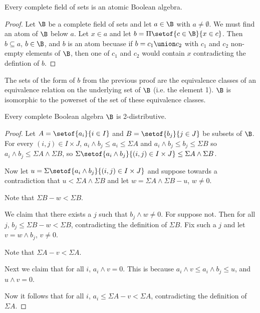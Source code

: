 \documentclass[oneside,12pt]{amsart}
\begin{document}
\begin{lemma}
Every complete field of sets is an atomic Boolean algebra.
\end{lemma}
\begin{proof}
Let $\B$ be a complete field of sets and let $a\in \B$ with $a\not= \emptyset$.
We must find an atom of $\B$ below $a$.
Let $x\in a$ and let $b = \Pi \setof{c\in \B}{x\in c}$. Then $b\subseteq a$,
$b\in \B$, and $b$ is an atom becuase if $b=c_1\union c_2$ with $c_1$ and $c_2$
non-empty elements of $\B$, then one of $c_1$ and $c_2$ would contain $x$ contradicting the defintion of $b$.
\end{proof}

The sets of the form of $b$ from the previous proof are the equivalence classes of an equivalence relation
on the underlying set of $\B$ (i.e. the element 1). $\B$ is isomorphic to the powerset of the set of
these equivalence classes.

\begin{lemma}
Every complete Boolean algebra $\B$ is 2-distributive.
\end{lemma}
\begin{proof}
Let $A=\setof{a_i}{i\in I}$ and $B=\setof{b_j}{j\in J}$ be subsets of $\B$.
For every $(i,j)\in I \times J$, $a_i \wedge b_j \leq a_i \leq \Sigma A$ and
$a_i \wedge b_j \leq b_j \leq \Sigma B$ so $a_i \wedge b_j \leq \Sigma A \wedge \Sigma B$,
so
$\Sigma \setof{a_i \wedge b_j}{(i,j)\in I \times J} \leq \Sigma A \wedge \Sigma B$.

Now let $u = \Sigma \setof{a_i \wedge b_j}{(i,j)\in I \times J}$ and suppose
towards a contradiction that
$u < \Sigma A \wedge \Sigma B$ and let $ w= \Sigma A \wedge \Sigma B - u$, $w\not=0$.

Note that $\Sigma B - w < \Sigma B$.

We claim that there exists a $j$ such that $b_j \wedge w \not= 0$. For suppose not.
Then for all $j$, $b_j\leq \Sigma B - w < \Sigma B$, contradicting the definition of $\Sigma B$.
Fix such a $j$ and let $v = w \wedge b_j$, $v\not=0$.

Note that $\Sigma A - v < \Sigma A$.

Next we claim that for all $i$, $a_i \wedge v = 0$. This is because
$a_i \wedge v \leq a_i \wedge b_j \leq u$, and $u \wedge v = 0$.

Now it follows that for all $i$, $a_i \leq \Sigma A - v < \Sigma A$,
contradicting the definition of $\Sigma A$.
\end{proof}
\end{document}
